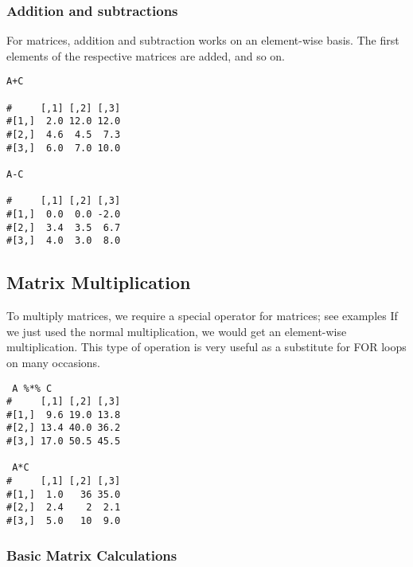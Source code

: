 \documentclass[a4paper,12pt]{article}
\begin{document}
\subsubsection{Addition and subtractions}
For matrices, addition and subtraction works on an element-wise basis.
The first elements of the respective matrices are added, and so on.


\begin{framed}
\begin{verbatim}
A+C

#     [,1] [,2] [,3]
#[1,]  2.0 12.0 12.0
#[2,]  4.6  4.5  7.3
#[3,]  6.0  7.0 10.0

A-C

#     [,1] [,2] [,3]
#[1,]  0.0  0.0 -2.0
#[2,]  3.4  3.5  6.7
#[3,]  4.0  3.0  8.0
\end{verbatim}
\end{framed}

\subsection{Matrix Multiplication}

To multiply matrices, we require a special operator for matrices; see examples
If we just used the normal multiplication, we would get an element-wise multiplication.
This type of operation is very useful as a substitute for FOR loops on many occasions.



\begin{framed}
\begin{verbatim}
 A %*% C
#     [,1] [,2] [,3]
#[1,]  9.6 19.0 13.8
#[2,] 13.4 40.0 36.2
#[3,] 17.0 50.5 45.5

 A*C
#     [,1] [,2] [,3]
#[1,]  1.0   36 35.0
#[2,]  2.4    2  2.1
#[3,]  5.0   10  9.0
\end{verbatim}
\end{framed}


\subsubsection{Basic Matrix Calculations}
\end{document}
